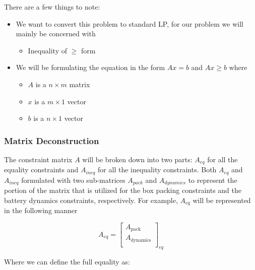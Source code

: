 \documentclass[conference]{IEEEtran}
\begin{document}
There are a few things to note:

\begin{itemize}
\item
  We want to convert this problem to standard LP, for our problem we
  will mainly be concerned with

  \begin{itemize}
  \item
    Inequality of \(\geq\) form
  \end{itemize}
\item
  We will be formulating the equation in the form \(Ax = b\) and
  \(Ax \geq b\) where

  \begin{itemize}
  \item
    \(A\) is a \(n \times m\) matrix
  \item
    \(x\) is a \(m \times 1\) vector
  \item
    \(b\) is a \(n \times 1\) vector
  \end{itemize}
\end{itemize}

\subsubsection{Matrix Deconstruction}\label{matrix-deconstruction}

The constraint matrix \(A\) will be broken down into two parts:
\(A_{eq}\) for all the equality constraints and \(A_{ineq}\) for all the
inequality constraints. Both \(A_{eq}\) and \(A_{ineq}\) formulated with
two sub-matrices \(A_{pack}\) and \(A_{dynamics}\) to represent the
portion of the matrix that is utilized for the box packing constraints
and the battery dynamics constraints, respectively. For example,
\(A_{eq}\) will be represented in the following manner

\[
A_{eq} =
\begin{bmatrix}
    A_{\textrm{pack}}     \\
    A_{\textrm{dynamics}} \\
\end{bmatrix}_{eq}
\]

Where we can define the full equality as:
\end{document}
